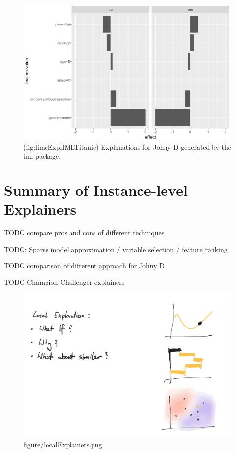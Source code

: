 \documentclass[12pt,]{krantz}
\theoremstyle{definition}
\theoremstyle{definition}
\theoremstyle{definition}
\theoremstyle{remark}
\begin{document}
\begin{figure}

{\centering \includegraphics[width=0.8\linewidth]{figure/lime_expl_iml_titanic} 

}

\caption{(fig:limeExplIMLTitanic) Explanations for Johny D generated by the iml package. }\label{fig:limeExplIMLTitanic}
\end{figure}

\hypertarget{summaryInstanceLevel}{%
\section{Summary of Instance-level
Explainers}\label{summaryInstanceLevel}}

TODO compare pros and cons of different techniques

TODO: Sparse model approximation / variable selection / feature ranking

TODO comparison of difrerent approach for Johny D

TODO Champion-Challenger explainers

\begin{figure}
\centering
\includegraphics{figure/localExplainers.png}
\caption{figure/localExplainers.png}
\end{figure}
\end{document}
